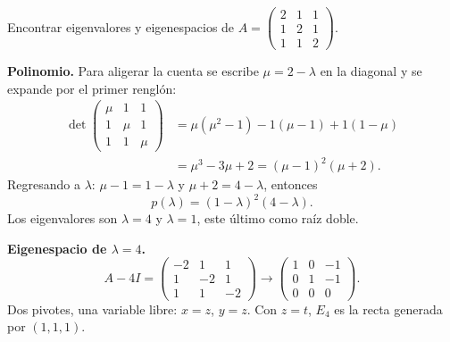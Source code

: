 \documentclass[11pt,letterpaper]{article}
\begin{document}
\begin{ejemplo}
    Encontrar eigenvalores y eigenespacios de
    $A = \begin{pmatrix} 2 & 1 & 1 \\ 1 & 2 & 1 \\ 1 & 1 & 2
    \end{pmatrix}$.

    \textbf{Polinomio.} Para aligerar la cuenta se escribe
    $\mu = 2 - \lambda$ en la diagonal y se expande por el primer
    renglón:
    \begin{align*}
        \det\begin{pmatrix} \mu & 1 & 1 \\ 1 & \mu & 1 \\
                            1 & 1 & \mu \end{pmatrix}
        &= \mu(\mu^2 - 1) - 1(\mu - 1) + 1(1 - \mu) \\
        &= \mu^3 - 3\mu + 2
         = (\mu - 1)^2 (\mu + 2) .
    \end{align*}
    Regresando a $\lambda$: $\mu - 1 = 1 - \lambda$ y
    $\mu + 2 = 4 - \lambda$, entonces
    \[
        p(\lambda) = (1 - \lambda)^2 (4 - \lambda) .
    \]
    Los eigenvalores son $\lambda = 4$ y $\lambda = 1$, este último
    como raíz doble.

    \textbf{Eigenespacio de $\lambda = 4$.}
    \[
        A - 4I = \begin{pmatrix} -2 & 1 & 1 \\ 1 & -2 & 1 \\
                                 1 & 1 & -2 \end{pmatrix}
        \longrightarrow
        \begin{pmatrix} 1 & 0 & -1 \\ 0 & 1 & -1 \\ 0 & 0 & 0
        \end{pmatrix} .
    \]
    Dos pivotes, una variable libre: $x = z$, $y = z$. Con $z = t$,
    $E_4$ es la recta generada por $(1, 1, 1)$.


\end{ejemplo}
\end{document}
